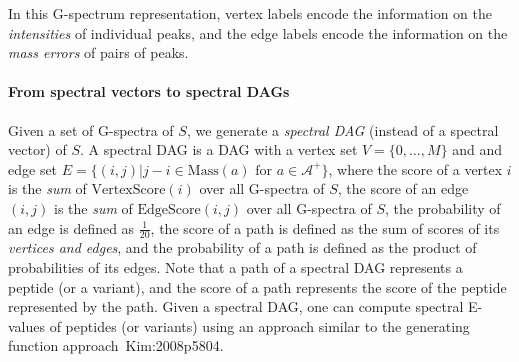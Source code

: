 In this G-spectrum representation, 
vertex labels encode the information on the {\em intensities} of individual peaks,
and the edge labels encode the information on the {\em mass errors} of pairs of peaks.


\paragraph{From spectral vectors to spectral DAGs}


Given a set of G-spectra of $S$, we generate a {\em spectral DAG} (instead of a spectral vector) of $S$. %
A spectral DAG is a DAG with a vertex set $V=\{0,\ldots,M\}$ and and edge set $E=\{(i,j) | j-i \in \textrm{Mass}(a) \textrm{ for } a \in \mathcal{A}^+\}$, 
where the score of a vertex $i$ is the {\em sum} of $\textrm{VertexScore}(i)$ over all G-spectra of $S$, 
the score of an edge $(i,j)$ is the {\em sum} of $\textrm{EdgeScore}(i,j)$ over all G-spectra of $S$,
the probability of an edge is defined as $\frac{1}{20}$, the score of a path is defined as the sum of scores of its {\em vertices and edges}, 
and the probability of a path is defined as the product of probabilities of its edges.
Note that a path of a spectral DAG represents a peptide (or a variant), and the score of a path represents the score of the peptide represented by the path.
%
Given a spectral DAG, one can compute spectral E-values of peptides (or variants) using an approach similar to the generating function approach~\cite{unv}{Kim:2008p5804}. 

